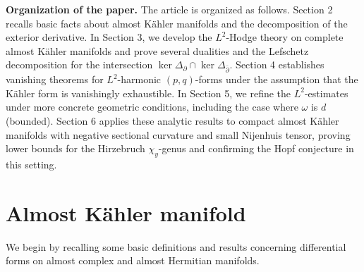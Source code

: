 \documentclass[12pt, twoside]{article}
\theoremstyle{definition}
\numberwithin{equation}{section}
\begin{document}
\noindent\textbf{Organization of the paper.} The article is organized as follows. Section 2 recalls basic facts about almost K\"ahler manifolds and the decomposition of the exterior derivative. In Section 3, we develop the $L^{2}$-Hodge theory on complete almost K\"ahler manifolds and prove several dualities and the Lefschetz decomposition for the intersection $\ker\Delta_{\partial}\cap\ker\Delta_{\bar{\partial}}$. Section 4 establishes vanishing theorems for $L^{2}$-harmonic $(p,q)$-forms under the assumption that the K\"ahler form is vanishingly exhaustible. In Section 5, we refine the $L^{2}$-estimates under more concrete geometric conditions, including the case where $\omega$ is $d$(bounded). Section 6 applies these analytic results to compact almost K\"ahler manifolds with negative sectional curvature and small Nijenhuis tensor, proving lower bounds for the Hirzebruch $\chi_{y}$-genus and confirming the Hopf conjecture in this setting.

\section{Almost K\"{a}hler manifold }
We begin by recalling some basic definitions and results concerning differential forms on almost complex and almost Hermitian manifolds.
\end{document}
